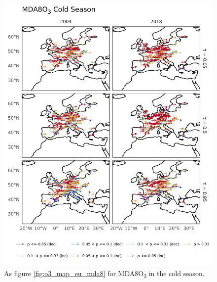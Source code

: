 \documentclass[journal abbreviation, manuscript]{copernicus}
\begin{document}
\begin{figure}[h!]
\centering
\includegraphics[height=0.9\textheight]{figures/paper_figures/o3_map/o3_map_piecewise_stats_freeTau_mda8_anom_cold_eu_o3.pdf}
\caption{As figure \ref{fig:o3_map_eu_mda8} for MDA8O\textsubscript{3} in the cold season.}
\label{fig:o3_map_eu_mda8_cold}
\end{figure}
\end{document}
